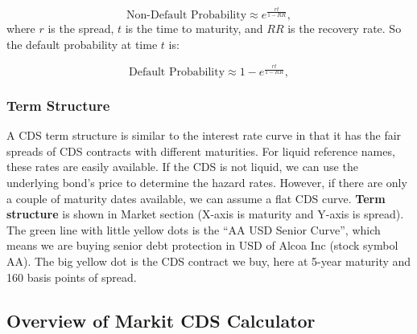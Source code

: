 \documentclass{jss}
\begin{document}
\begin{equation}
  \text{Non-Default Probability} \approx e ^ {\frac{rt}{1-RR}}, 
\end{equation}
where $r$ is the spread, $t$ is the time to maturity, and $RR$ is the recovery rate. So the default probability at time $t$ is:

\begin{equation}
  \text{Default Probability} \approx 1 - e ^ {\frac{rt}{1-RR}}, \nonumber
\end{equation}



\subsubsection{Term Structure}

A CDS term structure is similar to the interest rate curve in that it has the fair spreads of CDS contracts with different maturities. For liquid reference names, these rates are easily available. If the CDS is not liquid, we can use the underlying bond's price to determine the hazard rates. However, if there are only a couple of maturity dates available, we can assume a flat CDS curve. \textbf{Term structure} is shown in Market section (X-axis is maturity and Y-axis is spread). The green line with little yellow dots is the ``AA USD Senior Curve'', which means we are buying senior debt protection in USD of Alcoa Inc (stock symbol AA). The big yellow dot is the CDS contract we buy, here at 5-year maturity and 160 basis points of spread.

\newpage

\subsection{Overview of Markit CDS Calculator}
\label{Markit}
\end{document}
